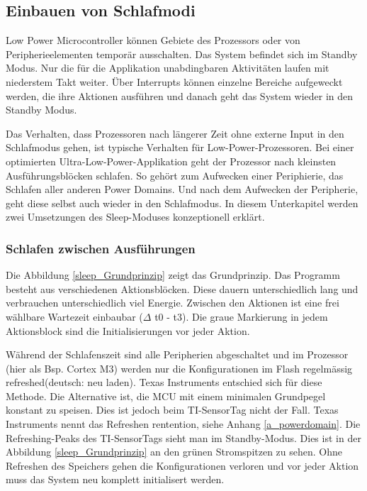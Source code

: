 \subsection{Einbauen von Schlafmodi}\label{pm_sleep} 

Low Power Microcontroller können Gebiete des Prozessors oder von Peripherieelementen temporär ausschalten. Das System befindet sich im Standby Modus. Nur die für die Applikation unabdingbaren Aktivitäten laufen mit niederstem Takt weiter. Über Interrupts können einzelne Bereiche aufgeweckt werden, die ihre Aktionen ausführen und danach geht das System wieder in den Standby Modus.

Das Verhalten, dass Prozessoren nach längerer Zeit ohne externe Input in den Schlafmodus gehen, ist typische Verhalten für Low-Power-Prozessoren. Bei einer optimierten Ultra-Low-Power-Applikation geht der Prozessor nach kleinsten Ausführungsblöcken schlafen. So gehört zum Aufwecken einer Periphierie, das Schlafen aller anderen Power Domains. Und nach dem Aufwecken der Peripherie, geht diese selbst auch wieder in den Schlafmodus. In diesem Unterkapitel werden zwei Umsetzungen des Sleep-Moduses konzeptionell erklärt.

\subsubsection{Schlafen zwischen Ausführungen}
\label{schlafen_theorie}

Die Abbildung \ref{sleep_Grundprinzip} zeigt das Grundprinzip. Das Programm besteht aus verschiedenen Aktionsblöcken. Diese dauern unterschiedlich lang und verbrauchen unterschiedlich viel Energie. Zwischen den Aktionen ist eine frei wählbare Wartezeit einbaubar ($\Delta$ t0 - t3). Die graue Markierung in jedem Aktionsblock sind die Initialisierungen vor jeder Aktion.

Während der Schlafenszeit sind alle Peripherien abgeschaltet und im Prozessor (hier als Bsp. Cortex M3) werden nur die Konfigurationen im Flash regelmässig \glqq refreshed\grqq (deutsch: neu laden). Texas Instruments entschied sich für diese Methode. Die Alternative ist, die MCU mit einem minimalen Grundpegel konstant zu speisen. Dies ist jedoch beim TI-SensorTag nicht der Fall. Texas Instruments nennt das Refreshen \glqq rentention\grqq, siehe Anhang \ref{a_powerdomain}. Die Refreshing-Peaks des TI-SensorTags sieht man im Standby-Modus. Dies ist in der Abbildung \ref{sleep_Grundprinzip} an den grünen Stromspitzen zu sehen. Ohne Refreshen des Speichers gehen die Konfigurationen verloren und vor jeder Aktion muss das System neu komplett initialisert werden.


